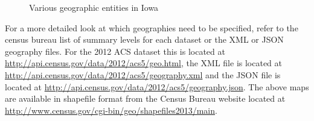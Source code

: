 \documentclass{article}\usepackage[]{graphicx}\usepackage[]{color}
\newenvironment{knitrout}{}{} %
\begin{document}
\begin{knitrout}
\begin{figure}[]
{}

\caption[Various geographic entities in Iowa]{Various geographic entities in Iowa\label{fig:iowa}}
\end{figure}


\end{knitrout}


For a more detailed look at which geographies need to be specified, refer to the census bureau list of summary levels for each dataset or the XML or JSON geography files.  For the 2012 ACS dataset this is located at \url{http://api.census.gov/data/2012/acs5/geo.html}, the XML file is located at \url{http://api.census.gov/data/2012/acs5/geography.xml} and the JSON file is located at \url{http://api.census.gov/data/2012/acs5/geography.json}.  The above maps are available in shapefile format from the Census Bureau website located at \url{http://www.census.gov/cgi-bin/geo/shapefiles2013/main}.
\end{document}

